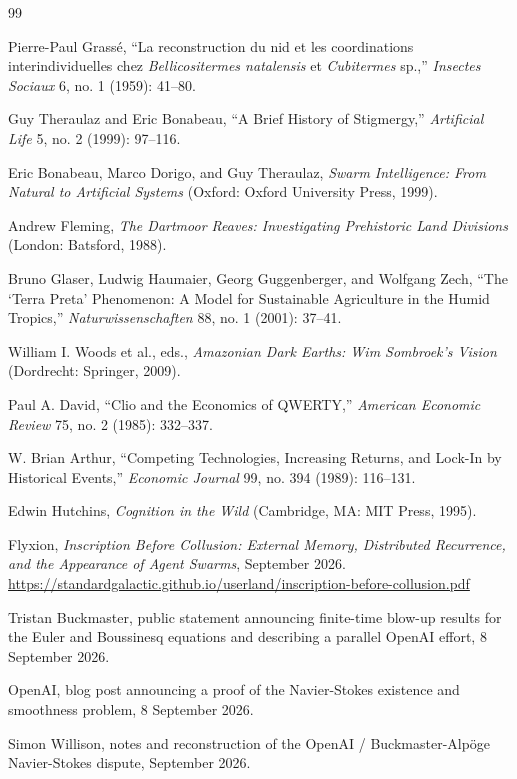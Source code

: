 \documentclass[11pt]{article}
\begin{document}
\begin{thebibliography}{99}

Pierre-Paul Grass\'{e}, ``La reconstruction du nid et les coordinations interindividuelles chez \emph{Bellicositermes natalensis} et \emph{Cubitermes} sp.,'' \emph{Insectes Sociaux} 6, no. 1 (1959): 41--80.

Guy Theraulaz and Eric Bonabeau, ``A Brief History of Stigmergy,'' \emph{Artificial Life} 5, no. 2 (1999): 97--116.

Eric Bonabeau, Marco Dorigo, and Guy Theraulaz, \emph{Swarm Intelligence: From Natural to Artificial Systems} (Oxford: Oxford University Press, 1999).

Andrew Fleming, \emph{The Dartmoor Reaves: Investigating Prehistoric Land Divisions} (London: Batsford, 1988).

Bruno Glaser, Ludwig Haumaier, Georg Guggenberger, and Wolfgang Zech, ``The `Terra Preta' Phenomenon: A Model for Sustainable Agriculture in the Humid Tropics,'' \emph{Naturwissenschaften} 88, no. 1 (2001): 37--41.

William I. Woods et al., eds., \emph{Amazonian Dark Earths: Wim Sombroek's Vision} (Dordrecht: Springer, 2009).

Paul A. David, ``Clio and the Economics of QWERTY,'' \emph{American Economic Review} 75, no. 2 (1985): 332--337.

W. Brian Arthur, ``Competing Technologies, Increasing Returns, and Lock-In by Historical Events,'' \emph{Economic Journal} 99, no. 394 (1989): 116--131.

Edwin Hutchins, \emph{Cognition in the Wild} (Cambridge, MA: MIT Press, 1995).

Flyxion, \emph{Inscription Before Collusion: External Memory, Distributed Recurrence, and the Appearance of Agent Swarms}, September 2026. \url{https://standardgalactic.github.io/userland/inscription-before-collusion.pdf}

Tristan Buckmaster, public statement announcing finite-time blow-up results for the Euler and Boussinesq equations and describing a parallel OpenAI effort, 8 September 2026.

OpenAI, blog post announcing a proof of the Navier-Stokes existence and smoothness problem, 8 September 2026.

Simon Willison, notes and reconstruction of the OpenAI / Buckmaster-Alp\"{o}ge Navier-Stokes dispute, September 2026.


\end{thebibliography}
\end{document}
